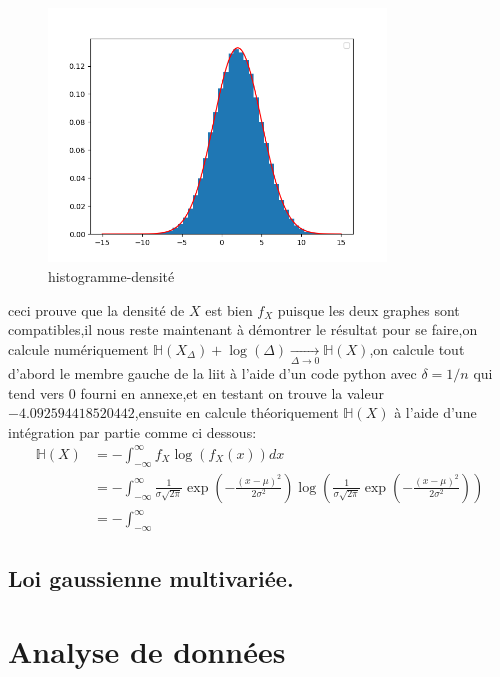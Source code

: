 \documentclass[a4paper]{article}
\begin{document}
\begin{figure}[h]
  \centering
  \includegraphics[width=0.8\textwidth]{Figure_1.png}
  \caption{histogramme-densité}
\end{figure}
ceci prouve que la densité de $X$ est bien $f_X$ puisque les deux graphes sont compatibles,il nous reste maintenant à démontrer le résultat
pour se faire,on calcule numériquement $\mathbb{H}(X_\Delta)+\log(\Delta)\underset{\Delta \rightarrow 0}{\rightarrow}\mathbb{H}(X)$,on calcule tout d'abord le membre gauche de la liit à l'aide d'un code python avec $\delta=1/n$ qui tend vers 0 fourni en annexe,et en testant on trouve la valeur $-4.092594418520442$,ensuite en calcule théoriquement $\mathbb{H}(X)$ à l'aide d'une intégration par partie comme ci dessous:
\begin{align}
  \mathbb{H}(X) &= -\int_{-\infty}^{\infty}f_{X}\log(f_X(x))dx\\
  &=-\int_{-\infty}^{\infty}\frac{1}{\sigma\sqrt{2\pi}}\exp\left(-\frac{(x-\mu)^{2}}{2\sigma^2}\right)\log\left(\frac{1}{\sigma\sqrt{2\pi}}\exp\left(-\frac{(x-\mu)^{2}}{2\sigma^2}\right)\right)\\
  &=-\int_{-\infty}^{\infty}
\end{align}
\newpage

\subsection{Loi gaussienne multivariée.}
\newpage

\section{Analyse de données}

\appendix
\end{document}

